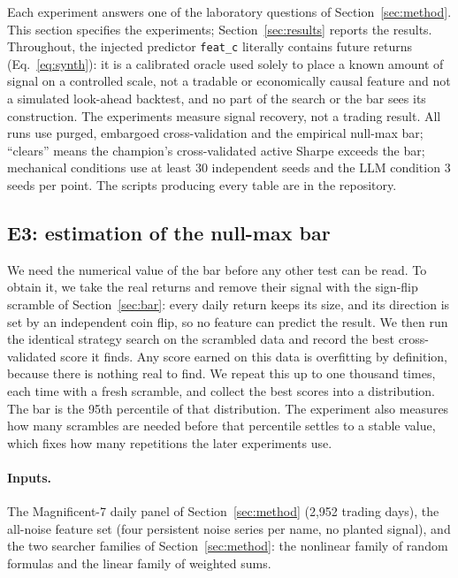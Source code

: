 \documentclass[11pt]{article}
\newcommand{\code}[1]{\texttt{#1}}
\begin{document}
Each experiment answers one of the laboratory questions of Section~\ref{sec:method}. This section
specifies the experiments; Section~\ref{sec:results} reports the results. Throughout, the injected
predictor \code{feat\_c} literally contains future returns (Eq.~\eqref{eq:synth}): it is a calibrated
oracle used solely to place a known amount of signal on a controlled scale, not a tradable or
economically causal feature and not a simulated look-ahead backtest, and no part of the search or the
bar sees its construction. The experiments measure signal recovery, not a trading result. All runs use
purged, embargoed cross-validation and the empirical null-max bar; ``clears'' means the champion's
cross-validated active Sharpe exceeds the bar; mechanical conditions use at least 30 independent seeds
and the LLM condition 3 seeds per point. The scripts producing every table are in the repository.

\subsection{E3: estimation of the null-max bar}

We need the numerical value of the bar before any
other test can be read. To obtain it, we take the real returns and remove their signal with the sign-flip
scramble of Section~\ref{sec:bar}: every daily return keeps its size, and its direction is set by an
independent coin flip, so no feature can predict the result. We then run the identical strategy search on
the scrambled data and record the best cross-validated score it finds. Any score earned on this data is
overfitting by definition, because there is nothing real to find. We repeat this up to one thousand
times, each time with a fresh scramble, and collect the best scores into a distribution. The bar is the
95th percentile of that distribution. The experiment also measures how many scrambles are needed before
that percentile settles to a stable value, which fixes how many repetitions the later experiments use.

\paragraph{Inputs.} The Magnificent-7 daily panel of Section~\ref{sec:method} (2{,}952 trading days),
the all-noise feature set (four persistent noise series per name, no planted signal), and the two
searcher families of Section~\ref{sec:method}: the nonlinear family of random formulas and the linear
family of weighted sums.
\end{document}
